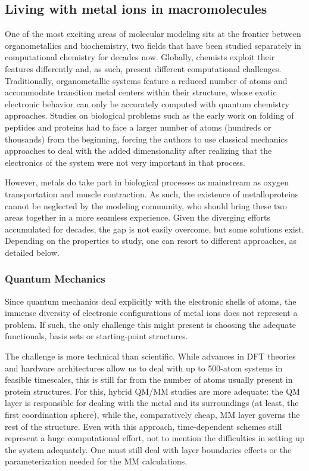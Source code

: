 \subsection{Living with metal ions in macromolecules}
One of the most exciting areas of molecular modeling sits at the frontier between organometallics and biochemistry, two fields that have been studied separately in computational chemistry for decades now. Globally, chemists exploit their features differently and, as such, present different computational challenges. Traditionally, organometallic systems feature a reduced number of atoms and accommodate transition metal centers within their structure, whose exotic electronic behavior can only be accurately computed with quantum chemistry approaches. Studies on biological problems such as the early work on folding of peptides and proteins had to face a larger number of atoms (hundreds or thousands) from the beginning, forcing the authors to use classical mechanics approaches to deal with the added dimensionality after realizing that the electronics of the system were not very important in that process.

However, metals do take part in biological processes as mainstream as oxygen transportation and muscle contraction. As such, the existence of metalloproteins cannot be neglected by the modeling community, who should bring these two areas together in a more seamless experience. Given the diverging efforts accumulated for decades, the gap is not easily overcome, but some solutions exist. Depending on the properties to study, one can resort to different approaches, as detailed below.

\subsubsection{Quantum Mechanics}
Since quantum mechanics deal explicitly with the electronic shells of atoms, the immense diversity of electronic configurations of metal ions does not represent a problem. If such, the only challenge this might present is choosing the adequate functionals, basis sets or starting-point structures.

The challenge is more technical than scientific. While advances in DFT theories and hardware architectures allow us to deal with up to 500-atom systems in feasible timescales, this is still far from the number of atoms usually present in protein structures. For this, hybrid QM/MM studies are more adequate: the QM layer is responsible for dealing with the metal and its surroundings (at least, the first coordination sphere), while the, comparatively cheap, MM layer governs the rest of the structure. Even with this approach, time-dependent schemes still represent a huge computational effort, not to mention the difficulties in setting up the system adequately. One must still deal with layer boundaries effects or the parameterization needed for the MM calculations.

